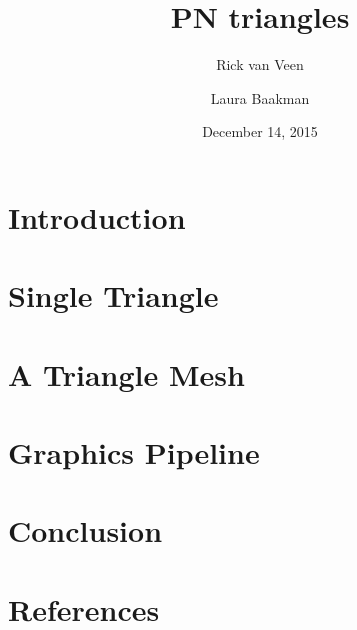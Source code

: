 \documentclass[13pt]{beamer}
\title{PN triangles}
\author{Rick van Veen \and Laura Baakman}
\date{December 14, 2015}
\begin{document}
	\begin{frame}
		\titlepage
	\end{frame}

	\section{Introduction}
	

	\section{Single Triangle}
	

	\section{A Triangle Mesh}
	

	\section{Graphics Pipeline}
	

	\section{Conclusion}
	

	\section{References}
	
\end{document}
